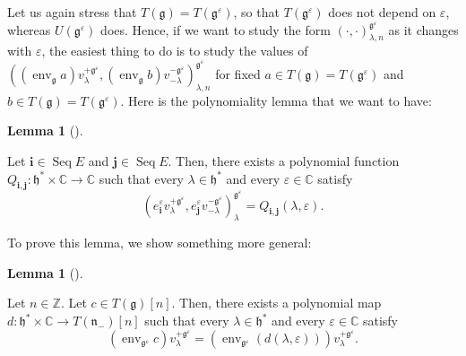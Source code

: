 \documentclass
[numbers=enddot,12pt,final,onecolumn,german,notitlepage]{scrartcl}%
\theoremstyle{definition}
\newtheorem{lem}[theo]{Lemma}
\newenvironment{lemma}[1][]
{\begin{lem}[#1]\begin{leftbar}}
{\end{leftbar}\end{lem}}
\begin{document}
Let us again stress that $T\left(  \mathfrak{g}\right)  =T\left(
\mathfrak{g}^{\varepsilon}\right)  $, so that $T\left(  \mathfrak{g}%
^{\varepsilon}\right)  $ does not depend on $\varepsilon$, whereas $U\left(
\mathfrak{g}^{\varepsilon}\right)  $ does. Hence, if we want to study the form
$\left(  \cdot,\cdot\right)  _{\lambda,n}^{\mathfrak{g}^{\varepsilon}}$ as it
changes with $\varepsilon$, the easiest thing to do is to study the values of
$\left(  \left(  \operatorname*{env}\nolimits_{\mathfrak{g}}a\right)
v_{\lambda}^{+\mathfrak{g}^{\varepsilon}},\left(  \operatorname*{env}%
\nolimits_{\mathfrak{g}}b\right)  v_{-\lambda}^{-\mathfrak{g}^{\varepsilon}%
}\right)  _{\lambda,n}^{\mathfrak{g}^{\varepsilon}}$ for fixed $a\in T\left(
\mathfrak{g}\right)  =T\left(  \mathfrak{g}^{\varepsilon}\right)  $ and $b\in
T\left(  \mathfrak{g}\right)  =T\left(  \mathfrak{g}^{\varepsilon}\right)  $.
Here is the polynomiality lemma that we want to have:

\begin{lemma}
\label{lem.invformnondeg.polynomiality}Let $\mathbf{i}\in\operatorname*{Seq}E$
and $\mathbf{j}\in\operatorname*{Seq}E$. Then, there exists a polynomial
function $Q_{\mathbf{i},\mathbf{j}}:\mathfrak{h}^{\ast}\times\mathbb{C}%
\rightarrow\mathbb{C}$ such that every $\lambda\in\mathfrak{h}^{\ast}$ and
every $\varepsilon\in\mathbb{C}$ satisfy%
\[
\left(  e_{\mathbf{i}}^{\varepsilon}v_{\lambda}^{+\mathfrak{g}^{\varepsilon}%
},e_{\mathbf{j}}^{\varepsilon}v_{-\lambda}^{-\mathfrak{g}^{\varepsilon}%
}\right)  _{\lambda}^{\mathfrak{g}^{\varepsilon}}=Q_{\mathbf{i},\mathbf{j}%
}\left(  \lambda,\varepsilon\right)  .
\]

\end{lemma}

To prove this lemma, we show something more general:

\begin{lemma}
\label{lem.invformnondeg.polynomiality2}Let $n\in\mathbb{Z}$. Let $c\in
T\left(  \mathfrak{g}\right)  \left[  n\right]  $. Then, there exists a
polynomial map $d:\mathfrak{h}^{\ast}\times\mathbb{C}\rightarrow T\left(
\mathfrak{n}_{-}\right)  \left[  n\right]  $ such that every $\lambda
\in\mathfrak{h}^{\ast}$ and every $\varepsilon\in\mathbb{C}$ satisfy%
\[
\left(  \operatorname*{env}\nolimits_{\mathfrak{g}^{\varepsilon}}c\right)
v_{\lambda}^{+\mathfrak{g}^{\varepsilon}}=\left(  \operatorname*{env}%
\nolimits_{\mathfrak{g}^{\varepsilon}}\left(  d\left(  \lambda,\varepsilon
\right)  \right)  \right)  v_{\lambda}^{+\mathfrak{g}^{\varepsilon}}.
\]

\end{lemma}
\end{document}
